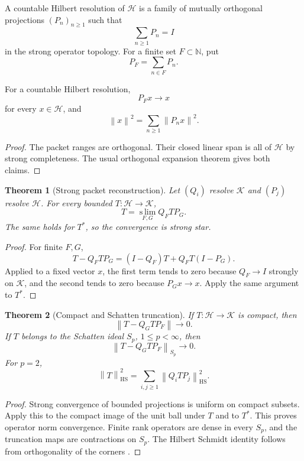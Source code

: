 \documentclass{aomart}
\newtheorem{theorem}{Theorem}[section]
\theoremstyle{definition}
\theoremstyle{remark}
\newcommand{\NN}{\mathbb N}
\newcommand{\K}{\mathcal K}
\newcommand{\Hh}{\mathcal H}
\newcommand{\norm}[1]{\left\lVert#1\right\rVert}
\newcommand{\Rcite}[1]{\cite{#1}}
\begin{document}
\begin{definition}\label{def:countable_resolution}
A countable Hilbert resolution of \(\Hh\) is a family of mutually orthogonal projections \((P_n)_{n\ge1}\) such that
\[
 \sum_{n\ge1}P_n=I
\]
in the strong operator topology. For a finite set \(F\subset\NN\), put
\[
 P_F=\sum_{n\in F}P_n.
\]
\end{definition}

\begin{lemma}\label{lem:strong_packet_sum}
For a countable Hilbert resolution,
\[
 P_Fx\longrightarrow x
\]
for every \(x\in\Hh\), and
\[
 \norm{x}^2
 =
 \sum_{n\ge1}\norm{P_nx}^2.
\]
\end{lemma}

\begin{proof}
The packet ranges are orthogonal. Their closed linear span is all of \(\Hh\) by strong completeness. The usual orthogonal expansion theorem gives both claims.
\end{proof}

\begin{theorem}[Strong packet reconstruction]\label{thm:strong_reconstruction}
Let \((Q_i)\) resolve \(\K\) and \((P_j)\) resolve \(\Hh\). For every bounded \(T:\Hh\to\K\),
\[
 \boxed{
 T
 =
 \operatorname*{s\!\!\lim}_{F,G}
 Q_FTP_G.
 }
\]
The same holds for \(T^*\), so the convergence is strong star.
\end{theorem}

\begin{proof}
For finite \(F,G\),
\[
 T-Q_FTP_G
 =
 (I-Q_F)T+Q_FT(I-P_G).
\]
Applied to a fixed vector \(x\), the first term tends to zero because \(Q_F\to I\) strongly on \(\K\), and the second tends to zero because \(P_Gx\to x\). Apply the same argument to \(T^*\).
\end{proof}

\begin{theorem}[Compact and Schatten truncation]\label{thm:compact_truncation}
If \(T:\Hh\to\K\) is compact, then
\[
 \norm{T-Q_GTP_F}\longrightarrow0.
\]
If \(T\) belongs to the Schatten ideal \(S_p\), \(1\le p<\infty\), then
\[
 \norm{T-Q_GTP_F}_{S_p}\longrightarrow0.
\]
For \(p=2\),
\[
 \boxed{
 \norm{T}_{\mathrm{HS}}^2
 =
 \sum_{i,j\ge1}\norm{Q_iTP_j}_{\mathrm{HS}}^2.
 }
\]
\end{theorem}

\begin{proof}
Strong convergence of bounded projections is uniform on compact subsets. Apply this to the compact image of the unit ball under \(T\) and to \(T^*\). This proves operator norm convergence. Finite rank operators are dense in every \(S_p\), and the truncation maps are contractions on \(S_p\). The Hilbert Schmidt identity follows from orthogonality of the corners \Rcite{R9}.
\end{proof}
\end{document}
